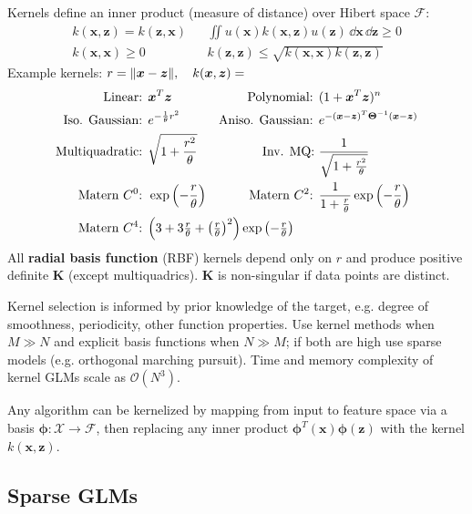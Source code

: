 \documentclass[twocolumn, 8pt]{extarticle}
\begin{document}
Kernels define an inner product (measure of distance) over Hibert space $\mathcal F$:
\begin{align*}
    k(\bm x, \bm z) = k(\bm z, \bm x) && \iint u(\bm x)k(\bm x, \bm z)u(\bm z)\,\dd\bm x\,\dd\bm z \geq 0 \\
    k(\bm x, \bm x) \geq 0 && k(\bm z, \bm z) \leq \sqrt{k(\bm x, \bm x)k(\bm z, \bm z)}
\end{align*}
Example kernels: \(r = \lVert\bm x - \bm z\rVert, \quad k(\bm x, \bm z) =\)
\begin{align*}
    \text{Linear: }& \bm x^T\bm z &
    \text{Polynomial: }& (1 + \bm x^T\bm z)^n \\
    \text{Iso. Gaussian: }& e^{-\frac{1}{\theta}r^2} &
    \text{Aniso. Gaussian: }& e^{-(\bm x - \bm z)^T\bm\Theta^{-1}(\bm x - \bm z)} \\
    \text{Multiquadratic: }& \sqrt{1 + \frac{r^2}{\theta}} &
    \text{Inv. MQ: }& \frac{1}{\sqrt{1 + \frac{r^2}{\theta}}} \\
    \text{Matern $C^0$: } & \exp\left(-\frac{r}{\theta}\right) &
    \text{Matern $C^2$: } & \frac{1}{1 + \frac{r}{\theta}}\exp\left(-\frac{r}{\theta}\right) \\
    \text{Matern $C^4$: } & \multicolumn{3}{l}{$\left(3 + 3\frac{r}{\theta} + \left(\frac{r}{\theta}\right)^2\right)\exp\left(-\frac{r}{\theta}\right)$}
\end{align*}
All \textbf{radial basis function} (RBF) kernels depend only on \(r\) and produce positive definite \(\bm K\) (except
multiquadrics). \(\bm K\) is non-singular if data points are distinct.

Kernel selection is informed by prior knowledge of the target, e.g. degree of smoothness, periodicity, other function
properties. Use kernel methods when \(M \gg N\) and explicit basis functions when \(N \gg M\); if both are high use
sparse models (e.g. orthogonal marching pursuit). Time and memory complexity of kernel GLMs scale as
\(\mathcal O(N^3)\).

Any algorithm can be kernelized by mapping from input to feature space via a basis \(\bm\phi \colon \mathcal X \to
\mathcal F\), then replacing any inner product \(\bm \phi^T(\bm x)\bm\phi(\bm z)\) with the kernel \(k(\bm x, \bm z)\).

\subsection{Sparse GLMs} %
\end{document}
